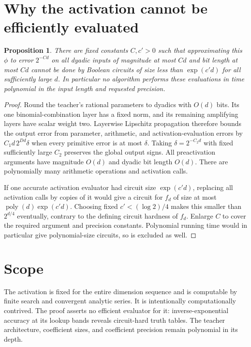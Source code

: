 \documentclass[11pt]{article}
\newtheorem{proposition}[theorem]{Proposition}
\theoremstyle{remark}\newtheorem{remark}[theorem]{Remark}
\newcommand{\poly}{\operatorname{poly}}
\begin{document}
\section{Why the activation cannot be efficiently evaluated}
\begin{proposition}\label{prop:evaluation}
There are fixed constants $C,c'>0$ such that approximating this
$\phi$ to error $2^{-Cd}$ on all dyadic inputs of magnitude
at most $Cd$ and bit length at most $Cd$ cannot be done by
Boolean circuits of size less than $\exp(c'd)$ for all
sufficiently large $d$. In particular no algorithm performs
these evaluations in time polynomial in the input length
and requested precision.
\end{proposition}
\begin{proof}
Round the teacher's rational parameters to dyadics with $O(d)$
bits. Its one binomial-combination layer has a fixed norm,
and its remaining amplifying layers have scalar weight two.
Layerwise Lipschitz propagation therefore bounds the output
error from parameter, arithmetic, and activation-evaluation
errors by $C_1d\,2^{Dd}\delta$ when every primitive error is
at most $\delta$. Taking $\delta=2^{-C_2d}$ with fixed
sufficiently large $C_2$ preserves the global output signs.
All preactivation arguments have magnitude $O(d)$ and
dyadic bit length $O(d)$. There are polynomially many
arithmetic operations and activation calls.

If one accurate activation evaluator had circuit size
$\exp(c'd)$, replacing all activation calls by copies of it
would give a circuit for $f_d$ of size at most
$\poly(d)\exp(c'd)$. Choosing fixed $c'<(\log2)/4$
makes this smaller than $2^{d/4}$ eventually, contrary to
the defining circuit hardness of $f_d$.
Enlarge $C$ to cover the required argument and precision
constants. Polynomial running time would in particular
give polynomial-size circuits, so is excluded as well.
\end{proof}

\section{Scope}

The activation is fixed for the entire dimension sequence and
is computable by finite search and convergent analytic series.
It is intentionally computationally contrived. The proof
asserts no efficient evaluator for it: inverse-exponential
accuracy at its lookup bands reveals circuit-hard truth tables.
The teacher architecture, coefficient sizes, and coefficient
precision remain polynomial in its depth.
\end{document}
